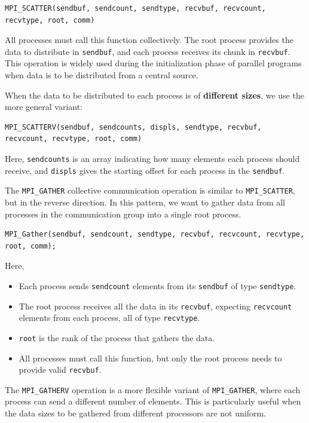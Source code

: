 \documentclass[12pt]{book}
\begin{document}
\begin{lstlisting}[style=cppstyle]
MPI_SCATTER(sendbuf, sendcount, sendtype, recvbuf, recvcount, recvtype, root, comm)
\end{lstlisting}


All processes must call this function collectively. The root process provides the data to distribute in \texttt{sendbuf}, and each process receives its chunk in \texttt{recvbuf}. This operation is widely used during the initialization phase of parallel programs when data is to be distributed from a central source.

When the data to be distributed to each process is of \textbf{different sizes}, we use the more general variant:

\begin{lstlisting}[style=cppstyle]
MPI_SCATTERV(sendbuf, sendcounts, displs, sendtype, recvbuf, recvcount, recvtype, root, comm)
\end{lstlisting}

Here, \texttt{sendcounts} is an array indicating how many elements each process should receive, and \texttt{displs} gives the starting offset for each process in the \texttt{sendbuf}.

The \texttt{MPI\_GATHER} collective communication operation is similar to \texttt{MPI\_SCATTER}, but in the reverse direction. In this pattern, we want to gather data from all processes in the communication group into a single root process.

\begin{lstlisting}[style=cppstyle]
MPI_Gather(sendbuf, sendcount, sendtype, recvbuf, recvcount, recvtype, root, comm);
\end{lstlisting}

Here,
\begin{itemize}
    \item Each process sends \texttt{sendcount} elements from its \texttt{sendbuf} of type \texttt{sendtype}.
    \item The root process receives all the data in its \texttt{recvbuf}, expecting \texttt{recvcount} elements from each process, all of type \texttt{recvtype}.
    \item \texttt{root} is the rank of the process that gathers the data.
    \item All processes must call this function, but only the root process needs to provide valid \texttt{recvbuf}.
\end{itemize}

\vspace{1em}
The \texttt{MPI\_GATHERV} operation is a more flexible variant of \texttt{MPI\_GATHER}, where each process can send a different number of elements. This is particularly useful when the data sizes to be gathered from different processors are not uniform.
\end{document}
